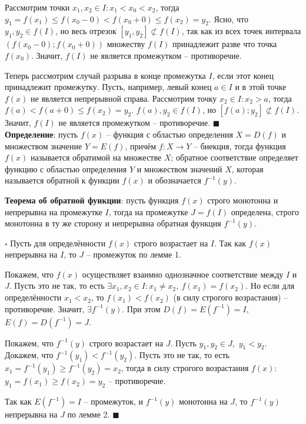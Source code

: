 \documentclass[12pt, a4paper, reqno]{article}
\begin{document}
    Рассмотрим точки $x_1, x_2\in I: x_1 < x_0 < x_2$, тогда $y_1 = f(x_1) \leq f(x_0 - 0) <
    f(x_0 + 0) \leq f(x_2) = y_2$. Ясно, что $y_1, y_2\in f(I)$, но весь отрезок
    $[y_1, y_2]\not\subset f(I)$, так как из всех точек интервала $(f(x_0 - 0); f(x_0 + 0))$
    множеству $f(I)$ принадлежит разве что точка $f(x_0)$. Значит, $f(I)$ не является промежутком --
    противоречие.

    Теперь рассмотрим случай разрыва в конце промежутка $I$, если этот конец принадлежит промежутку.
    Пусть, например, левый конец $a\in I$ и в этой точке $f(x)$ не является непрерывной справа.
    Рассмотрим точку $x_2\in I: x_2 > a$, тогда $f(a) < f(a + 0) \leq f(x_2) = y_2$. $f(a), y_2\in
    f(I)$, но $[f(a); y_2]\not\subset f(I)$. Значит, $f(I)$ не является промежутком -- противоречие.
    $\blacksquare$\\

    \textbf{Определение}: пусть $f(x)$ -- функция с областью определения $X = D(f)$ и множеством
    значение $Y = E(f)$, причём $f: X\to Y$ -- биекция, тогда функция $f(x)$ называется обратимой на
    множестве $X$; обратное соответствие определяет функцию с областью определения $Y$ и множеством
    значений $X$, которая называется обратной к функции $f(x)$ и обозначается $f^{-1}(y)$.

    \textbf{Теорема об обратной функции}: пусть функция $f(x)$ строго монотонна и непрерывна на
    промежутке $I$, тогда на промежутке $J = f(I)$ определена, строго монотонна в ту же сторону и
    непрерывна обратная функция $f^{-1}(y)$.

    $\square$ Пусть для определённости $f(x)$ строго возрастает на $I$. Так как $f(x)$ непрерывна на
    $I$, то $J$ -- промежуток по лемме 1.

    Покажем, что $f(x)$ осуществляет взаимно однозначное соответствие между $I$ и $J$. Пусть это не
    так, то есть $\exists x_1, x_2\in I: x_1\neq x_2,\ f(x_1) = f(x_2)$. Но если для определённости
    $x_1 < x_2$, то $f(x_1) < f(x_2)$ (в силу строгого возрастания) -- противоречие. Значит,
    $\exists f^{-1}(y)$. При этом $D(f) = E(f^{-1}) = I$, $E(f) = D(f^{-1}) = J$.

    Покажем, что $f^{-1}(y)$ строго возрастает на $J$. Пусть $y_1, y_2\in J$,\ $y_1 < y_2$. Докажем,
    что $f^{-1}(y_1) < f^{-1}(y_2)$. Пусть это не так, то есть $x_1 = f^{-1}(y_1) \geq f^{-1}(y_2) =
    x_2$, тогда в силу строгого возрастания $f(x)$: $y_1 = f(x_1) \geq f(x_2) = y_2$ --
    противоречие.

    Так как $E(f^{-1}) = I$ -- промежуток, и $f^{-1}(y)$ монотонна на $J$, то $f^{-1}(y)$ непрерывна
    на $J$ по лемме 2. $\blacksquare$
\end{document}
